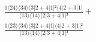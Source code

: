\documentclass[varwidth, border=5pt]{standalone}
\begin{document}
\begin{my}
$\begin{gathered}
\scriptscriptstyle\frac{1⟨24⟩⟨34⟩⟨3|2+4|1]²⟨4|2+3|1]}{⟨13⟩⟨14⟩⟨2|3+4|1]³} +\\
\scriptscriptstyle\frac{1⟨23⟩⟨34⟩⟨3|2+4|1]⟨4|2+3|1]²}{⟨13⟩⟨14⟩⟨2|3+4|1]³} \phantom{+}
\end{gathered}$
\end{my}
\end{document}
